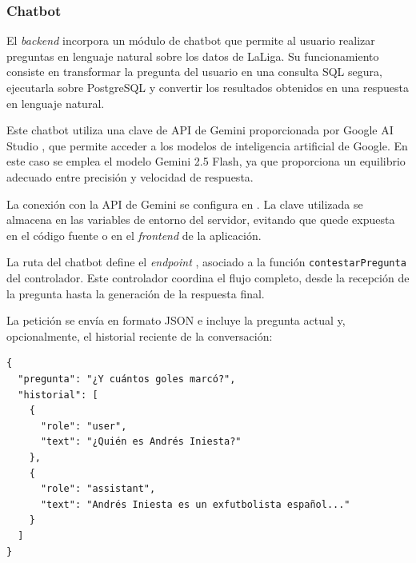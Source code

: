 


\subsubsection{Chatbot}

El \textit{backend} incorpora un módulo de chatbot que permite al usuario realizar preguntas en lenguaje natural sobre los datos de LaLiga. Su funcionamiento consiste en transformar la pregunta del usuario en una consulta SQL segura, ejecutarla sobre PostgreSQL y convertir los resultados obtenidos en una respuesta en lenguaje natural.

Este chatbot utiliza una clave de API de Gemini proporcionada por Google AI Studio \cite{aistudio}, que permite acceder a los modelos de inteligencia artificial de Google. En este caso se emplea el modelo Gemini 2.5 Flash, ya que proporciona un equilibrio adecuado entre precisión y velocidad de respuesta.

La conexión con la API de Gemini se configura en . La clave utilizada se almacena en las variables de entorno del servidor, evitando que quede expuesta en el código fuente o en el \textit{frontend} de la aplicación.

La ruta del chatbot define el \textit{endpoint} , asociado a la función \texttt{contestarPregunta} del controlador. Este controlador coordina el flujo completo, desde la recepción de la pregunta hasta la generación de la respuesta final.

La petición se envía en formato JSON e incluye la pregunta actual y, opcionalmente, el historial reciente de la conversación:

\begin{verbatim}
{
  "pregunta": "¿Y cuántos goles marcó?",
  "historial": [
    {
      "role": "user",
      "text": "¿Quién es Andrés Iniesta?"
    },
    {
      "role": "assistant",
      "text": "Andrés Iniesta es un exfutbolista español..."
    }
  ]
}
\end{verbatim}

